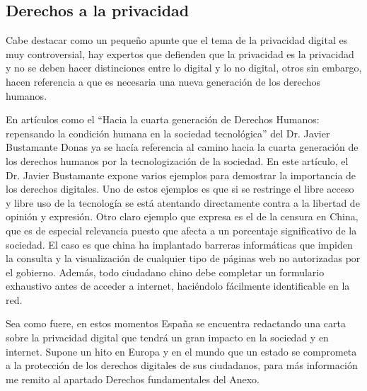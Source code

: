 \subsection{Derechos a la privacidad}
Cabe destacar como un pequeño apunte que el tema de la privacidad digital es muy controversial, hay expertos que defienden que la privacidad es la privacidad y no se deben hacer distinciones entre lo digital y lo no digital, otros sin embargo, hacen referencia a que es necesaria una nueva generación de los derechos humanos.

En artículos como el “Hacia la cuarta generación de Derechos Humanos: repensando la condición humana en la sociedad tecnológica”\autocite{donasHACIACUARTAGENERACION} del Dr. Javier Bustamante Donas ya se hacía referencia al camino hacia la cuarta generación de los derechos humanos por la tecnologización de la sociedad. En este artículo, el Dr. Javier Bustamante expone varios ejemplos para demostrar la importancia de los derechos digitales. Uno de estos ejemplos es que si se restringe el libre acceso y libre uso de la tecnología se está atentando directamente contra a la libertad de opinión y expresión. Otro claro ejemplo que expresa es el de la censura en China, que es de especial relevancia puesto que afecta a un porcentaje significativo de la sociedad. El caso es que china ha implantado barreras informáticas que impiden la consulta y la visualización de cualquier tipo de páginas web no autorizadas por el gobierno. Además, todo ciudadano chino debe completar un formulario exhaustivo antes de acceder a internet, haciéndolo fácilmente identificable en la red.

Sea como fuere, en estos momentos España se encuentra redactando una carta sobre la privacidad digital que tendrá un gran impacto en la sociedad y en internet. Supone un hito en Europa y en el mundo que un estado se comprometa a la protección de los derechos digitales de sus ciudadanos, para más información me remito al apartado Derechos fundamentales del Anexo.
